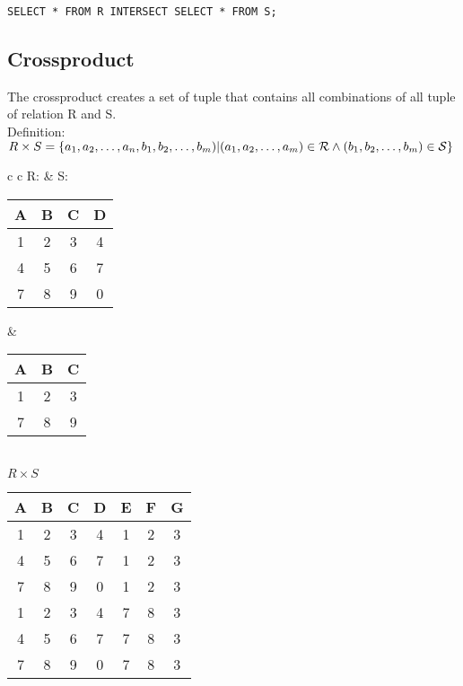 \lstset{language=SQL,tabsize=4,captionpos=b,frame=single,
basicstyle=\footnotesize}
\begin{lstlisting}[caption=SQL Mean]
SELECT * FROM R INTERSECT SELECT * FROM S;
\end{lstlisting}

\subsection{Crossproduct}
The crossproduct creates a set of tuple that contains all combinations of all
tuple of relation R and S.\\
Definition: $R \times S = \{a_1, a_2, \dots, a_n, b_1, b_2, \dots, b_m) |\\
(a_1, a_2, \dots, a_m) \in \mathcal{R} \land (b_1, b_2, \dots, b_m) \in
\mathcal{S} \}$

\begin{tabular}{ c c}
	R: & S:\\
	\begin{tabular}{|c|c|c|c|}
		\hline
		A & B & C & D\\
		\hline
		1 & 2 & 3 & 4\\
		\hline
		4 & 5 & 6 & 7\\
		\hline
		7 & 8 & 9 & 0\\
		\hline
	\end{tabular} &

	\begin{tabular}{|c|c|c|}
		\hline
		A & B & C\\
		\hline
		1 & 2 & 3\\
		\hline
		7 & 8 & 9\\
		\hline
	\end{tabular}
\end{tabular}\\

\hspace{1cm}$R \times S$\\
\begin{tabular}{|c|c|c|c|c|c|c|}
	\hline
	A & B & C & D & E & F & G\\
	\hline
	1 & 2 & 3 & 4 & 1 & 2 & 3\\
	\hline
	4 & 5 & 6 & 7 & 1 & 2 & 3\\
	\hline
	7 & 8 & 9 & 0 & 1 & 2 & 3\\
	\hline
	1 & 2 & 3 & 4 & 7 & 8 & 3\\
	\hline
	4 & 5 & 6 & 7 & 7 & 8 & 3\\
	\hline
	7 & 8 & 9 & 0 & 7 & 8 & 3\\
	\hline
\end{tabular}\\

